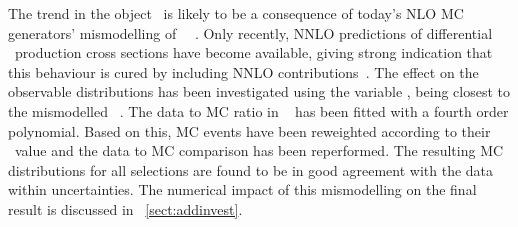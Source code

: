 The trend in the object \pt\ is likely to be a consequence of today's \gls{NLO} \gls{MC} generators' mismodelling of \tquark\ \pt~\cite{ATL-PHYS-PUB-2015-002,Aad:1993530}. Only recently, \gls{NNLO} predictions of differential \tquark\ production cross sections have become available, giving strong indication that this behaviour is cured by including \gls{NNLO} contributions~\cite{Czakon:2015owf}. 
%
%
The effect on the observable distributions has been investigated using the variable \ptlb, being closest to the mismodelled \tquark\ \pt. The data to \gls{MC} ratio in \fig~ has been fitted with a fourth order polynomial. Based on this, \gls{MC} events have been reweighted according to their \ptlb\ value and the data to \gls{MC} comparison has been reperformed. The resulting \gls{MC} distributions for all selections are found to be in good agreement with the data within uncertainties. The numerical impact of this mismodelling on the final result is discussed in \sect~\ref{sect:addinvest}.
%
%
